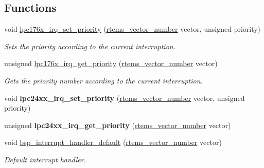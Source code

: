 \subsection*{Functions}
\begin{DoxyCompactItemize}
\item 
void \mbox{\hyperlink{group__bsp__interrupt_ga593c8b5fc394cf69ab409bdec2db0b57}{lpc176x\+\_\+irq\+\_\+set\+\_\+priority}} (\mbox{\hyperlink{group__ClassicINTR_ga3e434c197d99f128e78cae4d9358bd8b}{rtems\+\_\+vector\+\_\+number}} vector, unsigned priority)
\begin{DoxyCompactList}\small\item\em Sets the priority according to the current interruption. \end{DoxyCompactList}\item 
unsigned \mbox{\hyperlink{group__bsp__interrupt_ga6d885e8d96202e57cc6ef45556c26d85}{lpc176x\+\_\+irq\+\_\+get\+\_\+priority}} (\mbox{\hyperlink{group__ClassicINTR_ga3e434c197d99f128e78cae4d9358bd8b}{rtems\+\_\+vector\+\_\+number}} vector)
\begin{DoxyCompactList}\small\item\em Gets the priority number according to the current interruption. \end{DoxyCompactList}\item 
\mbox{\label{group__bsp__interrupt_ga22acbe7d34237536781f00ec665ce4fb}} 
void {\bfseries lpc24xx\+\_\+irq\+\_\+set\+\_\+priority} (\mbox{\hyperlink{group__ClassicINTR_ga3e434c197d99f128e78cae4d9358bd8b}{rtems\+\_\+vector\+\_\+number}} vector, unsigned priority)
\item 
\mbox{\label{group__bsp__interrupt_ga9a688d2421056aea7ab67029a2e6a52d}} 
unsigned {\bfseries lpc24xx\+\_\+irq\+\_\+get\+\_\+priority} (\mbox{\hyperlink{group__ClassicINTR_ga3e434c197d99f128e78cae4d9358bd8b}{rtems\+\_\+vector\+\_\+number}} vector)
\item 
void \mbox{\hyperlink{group__bsp__interrupt_ga3f1754ddeb359b41b89f90ad7fd81d58}{bsp\+\_\+interrupt\+\_\+handler\+\_\+default}} (\mbox{\hyperlink{group__ClassicINTR_ga3e434c197d99f128e78cae4d9358bd8b}{rtems\+\_\+vector\+\_\+number}} vector)
\begin{DoxyCompactList}\small\item\em Default interrupt handler. \end{DoxyCompactList}\item 

\end{DoxyCompactItemize}
